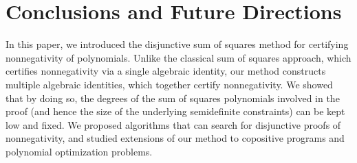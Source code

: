 \documentclass[12pt]{article}
\theoremstyle{remark}
\begin{document}





\section{Conclusions and Future Directions}\label{sec:discussion}
In this paper, we introduced the disjunctive sum of squares method for certifying nonnegativity of polynomials.
Unlike the classical sum of squares approach, which certifies nonnegativity via a single algebraic identity, our method constructs multiple algebraic identities, which together certify nonnegativity. 
We showed that by doing so, the degrees of the sum of squares polynomials involved in the proof (and hence the size of the underlying semidefinite constraints) can be kept low and fixed. We proposed algorithms that can search for disjunctive proofs of nonnegativity, and studied extensions of our method to copositive programs and polynomial optimization problems.
\end{document}
